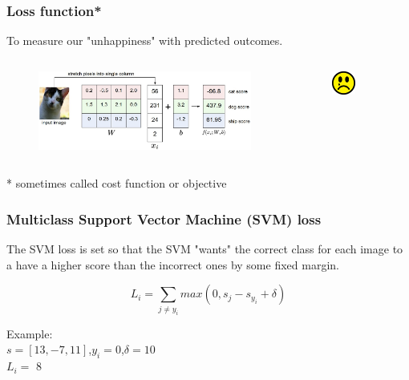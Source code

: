 \begin{frame}
	\frametitle{Loss function*}

	\vskip 0.5cm

	To measure our "unhappiness" with predicted outcomes.

	\begin{columns}
        	\begin{figure}
                	\includegraphics[width=1\textwidth]{Pics/imagemap.jpg}
        	\end{figure}
                \begin{figure}
                        \includegraphics[width=0.5\textwidth]{Pics/unhappy.png}
                \end{figure}
	\end{columns}	

	\vskip 1.5cm
	\small{* sometimes called cost function or objective}

\end{frame}

\begin{frame}
	\frametitle{Multiclass Support Vector Machine (SVM) loss}

	The SVM loss is set so that the SVM "wants" the correct class for each image to a have a higher score than the incorrect ones by some fixed margin.

	\begin{equation*}
		L_i = \sum_{j \neq y_i} max (0, s_j-s_{y_i} + \delta)
	\end{equation*}

	Example:\\
	$s=[13,-7,11]$,$y_i=0$,$\delta=10$\\
	$L_i = $ \pause $8$	

\end{frame}

